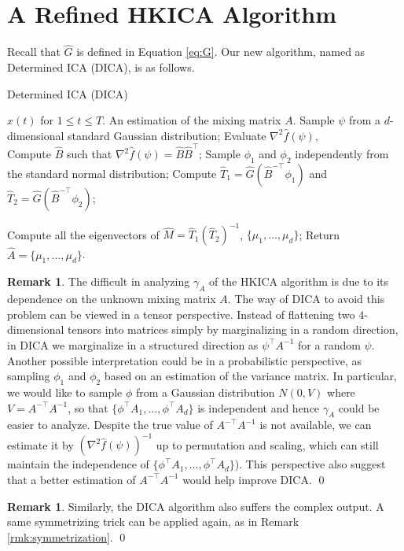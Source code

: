 \documentclass[twoside]{article}
\theoremstyle{definition}
\newtheorem{remark}[lemma]{Remark}
\begin{document}
\section{A Refined HKICA Algorithm}
\label{sec:DICA}
Recall that $\widehat{G}$ is defined in Equation \eqref{eq:G}.
Our new algorithm, named as Determined ICA (DICA), is as follows. 
\begin{algorithm}[H]
\caption{Determined ICA (DICA)}
\begin{algorithmic}[1]
\INPUT $x(t)$ for $1\le t \le T$. 
\OUTPUT An estimation of the mixing matrix $A$. 
\STATE Sample $\psi$ from a $d$-dimensional standard Gaussian distribution;
\STATE Evaluate $\nabla^2\widehat{f}(\psi)$, \\
\STATE Compute $\widehat{B}$ such that $\nabla^2\widehat{f}(\psi) = \widehat{B}\widehat{B}^{\top}$;
\STATE Sample $\phi_1$ and $\phi_2$ independently from the standard normal distribution;
\STATE Compute $\widehat{T}_1 = \widehat{G}(\widehat{B}^{-\top}\phi_1)$ and  $\widehat{T}_2 =\widehat{G}(\widehat{B}^{-\top}\phi_2)$;

\STATE Compute all the eigenvectors of $\widehat{M} = \widehat{T}_1\left(\widehat{T}_2\right)^{-1}$, $\{\mu_1,\ldots,\mu_d\}$;
\STATE Return $\widehat{A} = \{\mu_1,\ldots,\mu_d\}$.
\end{algorithmic}
\end{algorithm}
\begin{remark}
The difficult in analyzing $\gamma_A$ of the HKICA algorithm is due to its dependence on the unknown mixing matrix $A$. 
The way of DICA to avoid this problem can be viewed in a tensor perspective. 
Instead of flattening two $4$-dimensional tensors into matrices simply by marginalizing in a random direction, in DICA we marginalize in a structured direction as $\psi^{\top}A^{-1}$ for a random $\psi$. 
Another possible interpretation could be in a  probabilistic perspective, as sampling $\phi_1$ and $\phi_2$ based on an estimation of the variance matrix. 
In particular, we would like to sample $\phi$ from a Gaussian distribution $N(0,V)$ where $V = A^{-\top}A^{-1}$, so that $\{\phi^{\top}A_1, \ldots, \phi^{\top}A_d \}$ is independent and hence $\gamma_A$ could be easier to analyze. 
Despite the true value of $A^{-\top}A^{-1}$ is not available, we can estimate it by $\left(\nabla^2\widehat{f}(\psi)\right)^{-1}$ up to permutation and scaling,
which can still maintain the independence of $\{\phi^{\top}A_1, \ldots, \phi^{\top}A_d \}$). 
This perspective also suggest that a better estimation of $A^{-\top}A^{-1}$ would help improve DICA. \qed
\end{remark}
\begin{remark}
Similarly, the DICA algorithm also suffers the complex output. 
A same symmetrizing trick can be applied again, as in Remark \ref{rmk:symmetrization}. \qed 
\end{remark}
\end{document}
